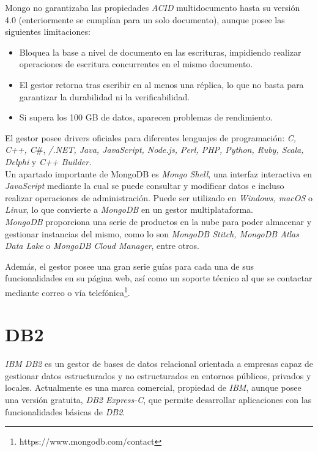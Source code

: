 \documentclass[11pt,a4paper]{article}
\begin{document}
Mongo no garantizaba las propiedades \emph{ACID} multidocumento hasta su versión 4.0 (enteriormente se cumplían para un solo documento), aunque posee las siguientes limitaciones\cite{WIKI:15}: 

\begin{itemize}
	\item Bloquea la base a nivel de documento en las escrituras, impidiendo realizar operaciones de escritura concurrentes en el mismo documento. 
	\item El gestor retorna tras escribir en al menos una réplica, lo que no basta para garantizar la durabilidad ni la verificabilidad.\cite{MDB:9}
	\item Si supera los 100 GB de datos, aparecen problemas de rendimiento.\cite{MDB:10}
\end{itemize}

El gestor posee drivers oficiales para diferentes lenguajes de programación: \emph{C, C++, C}\#, \emph{/.NET, Java, JavaScript, Node.js, Perl, PHP, Python, Ruby, Scala, Delphi} y \emph{C++ Builder.}\\

Un apartado importante de MongoDB es \emph{Mongo Shell}\cite{MDB:6}, una interfaz interactiva en \emph{JavaScript} mediante la cual se puede consultar y modificar datos e incluso realizar operaciones de administración. Puede ser utilizado en \emph{Windows, macOS} o \emph{Linux}, lo que convierte a \emph{MongoDB} en un gestor multiplataforma.\\

\emph{MongoDB} proporciona una serie de productos en la nube para poder almacenar y gestionar instancias del mismo, como lo son \emph{MongoDB Stitch, MongoDB Atlas Data Lake} o \emph{MongoDB Cloud Manager}, entre otros.\cite{MDB:7}

Además, el gestor posee una gran serie guías para cada una de sus funcionalidades en su página web\cite{MDB:8}, así como un soporte técnico al que se contactar mediante correo o vía telefónica\footnote{https://www.mongodb.com/contact}.

\newpage

\section{DB2}

\emph{IBM DB2} es un gestor de bases de datos relacional orientada a empresas capaz de gestionar datos estructurados y no estructurados en entornos públicos, privados y locales.\cite{DB2:1} Actualmente es una marca comercial, propiedad de \emph{IBM}, aunque posee una versión gratuita, \emph{DB2 Express-C}\cite{DB2:2}, que permite desarrollar aplicaciones con las funcionalidades básicas de \emph{DB2}.\\
\end{document}
